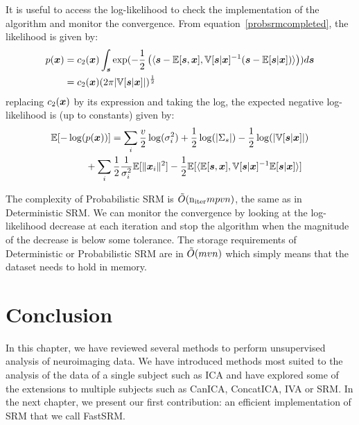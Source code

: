 It is useful to access the log-likelihood to check the implementation of the
algorithm and monitor the convergence. From equation~\eqref{probsrmcompleted},
the likelihood is given by:
\begin{align}
  p(\boldsymbol{x}) &= c_2(\boldsymbol{x}) \int_{\boldsymbol{s}} \exp(-\frac12 \left( \langle{  \boldsymbol{s}- \mathbb{E}[\boldsymbol{s}},{ \boldsymbol{x}], \mathbb{V}[\boldsymbol{s} | \boldsymbol{x}]^{-1} ( \boldsymbol{s} - \mathbb{E}[\boldsymbol{s} | \boldsymbol{x}])  }\rangle \right)) d\boldsymbol{s} \\
         &= c_2(\boldsymbol{x}) (2 \pi |\mathbb{V}[\boldsymbol{s} | \boldsymbol{x}]|)^{\frac12}
\end{align}
replacing $c_2(\boldsymbol{x})$ by its expression and taking the log, the expected negative
log-likelihood is (up to constants) given by:
\begin{align}
  \mathbb{E}[-\log(&p(\boldsymbol{x}))] = \sum_i \frac{v}{2} \log(\sigma_i^2) + \frac12 \log(|\Sigma_s|) - \frac12 \log(|\mathbb{V}[\boldsymbol{s} | \boldsymbol{x}]|) \nonumber \\ &+ \sum_i
  \frac12 \frac1{\sigma_i^2} \mathbb{E}[\|\boldsymbol{x}_i\|^2] - \frac12 \mathbb{E}[\langle{  \mathbb{E}[\boldsymbol{s}},{ \boldsymbol{x}], \mathbb{V}[\boldsymbol{s} | \boldsymbol{x}]^{-1} \mathbb{E}[\boldsymbol{s} | \boldsymbol{x}] }\rangle]
\end{align}

The complexity of Probabilistic SRM is $\tilde{O}(\mathrm{n_{iter}} mpvn)$, the same as in
Deterministic SRM.
We can monitor the convergence by looking at the log-likelihood decrease at each iteration
and stop the algorithm when the magnitude of the decrease is below some
tolerance.
The storage requirements of Deterministic or Probabilistic SRM are in
$\tilde{O}(mvn)$ which simply means that the dataset needs to hold in memory.

\section{Conclusion}
In this chapter, we have reviewed several methods to perform unsupervised
analysis of neuroimaging data. We have introduced methods most suited to the analysis
of the data of a single subject such as ICA and have explored some of the
extensions to multiple subjects such as CanICA, ConcatICA, IVA or SRM.
In the next chapter, we present our first contribution: an efficient
implementation of SRM that we call FastSRM.



